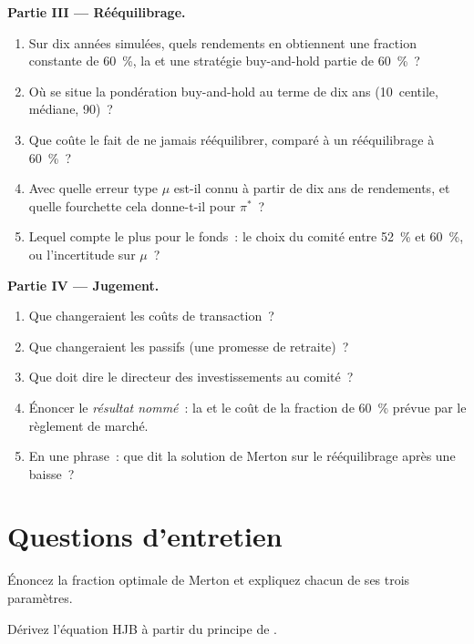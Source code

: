 \begin{problem}
\medskip\noindent\textbf{Partie III --- Rééquilibrage.}
\begin{enumerate}[resume]
\item Sur dix années simulées, quels rendements en  obtiennent une fraction constante de 60~\%, la  et une stratégie buy-and-hold partie de 60~\%~?
\item Où se situe la pondération buy-and-hold au terme de dix ans (10~centile, médiane, 90)~?
\item Que coûte le fait de ne jamais rééquilibrer, comparé à un rééquilibrage à 60~\%~?
\item Avec quelle erreur type $\mu$ est-il connu à partir de dix ans de rendements, et quelle fourchette cela donne-t-il pour $\pi^*$~?
\item Lequel compte le plus pour le fonds~: le choix du comité entre 52~\% et 60~\%, ou l'incertitude sur $\mu$~?
\end{enumerate}

\medskip\noindent\textbf{Partie IV --- Jugement.}
\begin{enumerate}[resume]
\item Que changeraient les coûts de transaction~?
\item Que changeraient les passifs (une promesse de retraite)~?
\item Que doit dire le directeur des investissements au comité~?
\item Énoncer le \emph{résultat nommé}~: la  et le coût de la fraction de 60~\% prévue par le règlement de marché.
\item En une phrase~: que dit la solution de Merton sur le rééquilibrage après une baisse~?
\end{enumerate}
\end{problem}

\section{Questions d'entretien}

\begin{interviewq}\label{iq:qm:stochastic-control:1}
Énoncez la fraction optimale de Merton et expliquez chacun de ses trois paramètres.
\end{interviewq}

\begin{interviewq}\label{iq:qm:stochastic-control:2}
Dérivez l'équation HJB à partir du principe de .
\end{interviewq}

